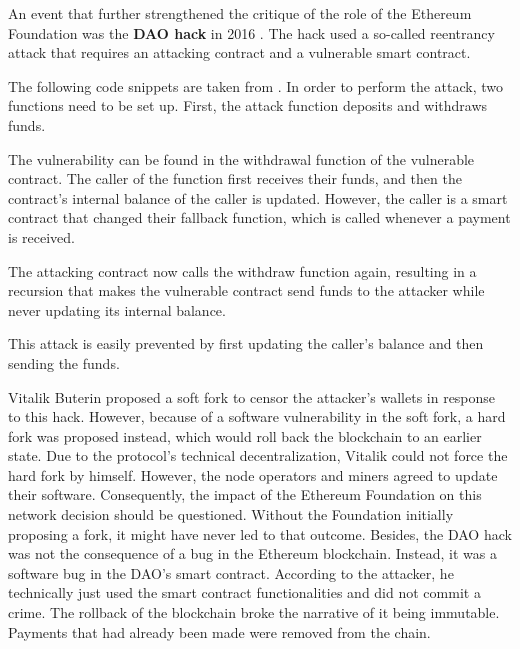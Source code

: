 An event that further strengthened the critique of the role of the Ethereum Foundation was the \textbf{DAO hack} in 2016 \cite{dao_hack}.
The hack used a so-called reentrancy attack that requires an attacking contract and a vulnerable smart contract.

The following code snippets are taken from \cite{reentrency_attack_snippets}.
In order to perform the attack, two functions need to be set up.
First, the attack function deposits and withdraws funds.


The vulnerability can be found in the withdrawal function of the vulnerable contract.
The caller of the function first receives their funds, and then the contract's internal balance of the caller is updated.
However, the caller is a smart contract that changed their fallback function, which is called whenever a payment is received.

The attacking contract now calls the withdraw function again, resulting in a recursion that makes the vulnerable contract send funds to the attacker while never updating its internal balance.

This attack is easily prevented by first updating the caller's balance and then sending the funds.

Vitalik Buterin proposed a soft fork to censor the attacker's wallets in response to this hack.
However, because of a software vulnerability in the soft fork, a hard fork was proposed instead, which would roll back the blockchain to an earlier state.
Due to the protocol's technical decentralization, Vitalik could not force the hard fork by himself. However, the node operators and miners agreed to update their software.
Consequently, the impact of the Ethereum Foundation on this network decision should be questioned. 
Without the Foundation initially proposing a fork, it might have never led to that outcome.
Besides, the DAO hack was not the consequence of a bug in the Ethereum blockchain. Instead, it was a software bug in the DAO's smart contract. 
According to the attacker, he technically just used the smart contract functionalities and did not commit a crime. \cite{dao_hack}
The rollback of the blockchain broke the narrative of it being immutable. Payments that had already been made were removed from the chain.

